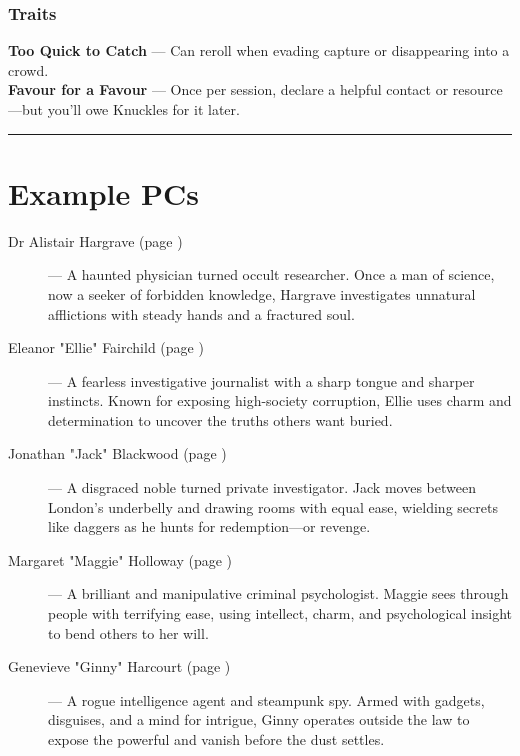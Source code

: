 \begin{paracol}{3}
        \subsubsection{Traits}
            \textbf{Too Quick to Catch} — Can reroll when evading capture or disappearing into a crowd.\\
            \noindent\textbf{Favour for a Favour} — Once per session, declare a helpful contact or resource—but you’ll owe Knuckles for it later.
    \end{paracol}
    \vspace{.5\baselineskip}
    \hrule
    \vspace{.5\baselineskip}

\newpage
\section{Example PCs}

\begin{description}
    \item[Dr Alistair Hargrave (page \pageref{pc:alistair-hargrave})] --- A haunted physician turned occult researcher. Once a man of science, now a seeker of forbidden knowledge, Hargrave investigates unnatural afflictions with steady hands and a fractured soul.

    \item[Eleanor "Ellie" Fairchild (page \pageref{pc:eleanor-fairchild})] --- A fearless investigative journalist with a sharp tongue and sharper instincts. Known for exposing high-society corruption, Ellie uses charm and determination to uncover the truths others want buried.

    \item[Jonathan "Jack" Blackwood (page \pageref{pc:jack-blackwood})] --- A disgraced noble turned private investigator. Jack moves between London's underbelly and drawing rooms with equal ease, wielding secrets like daggers as he hunts for redemption—or revenge.

    \item[Margaret "Maggie" Holloway (page \pageref{pc:maggie-holloway})] --- A brilliant and manipulative criminal psychologist. Maggie sees through people with terrifying ease, using intellect, charm, and psychological insight to bend others to her will.

    \item[Genevieve "Ginny" Harcourt (page \pageref{pc:ginny-harcourt})] --- A rogue intelligence agent and steampunk spy. Armed with gadgets, disguises, and a mind for intrigue, Ginny operates outside the law to expose the powerful and vanish before the dust settles.
\end{description}
    
